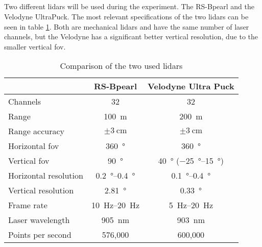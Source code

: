 \subsection{}
Two different \acrshort{lidar}s will be used during the experiment.
The RS-Bpearl and the Velodyne UltraPuck.
The most relevant specifications of the two \acrshort{lidar}s can be seen in table \ref{tab:lidar_datasheets}.
Both are mechanical \acrshort{lidar}s and have the same number of laser channels, but the Velodyne has a significant better vertical resolution, due to the smaller vertical \acrshort{fov}.
\begin{table}[ht]
	\centering
	\caption{Comparison of the two used \acrshort{lidar}s \cite{RoboSense2020}\cite{Rev}}
	\label{tab:lidar_datasheets}
	\begin{tabular}[t]{lcc}
	\toprule
	&\textbf{RS-Bpearl} & \textbf{Velodyne Ultra Puck}\\
	\midrule
	Channels 					& 32 							& 32\\
	Range 						& \SI{100}{\metre}				& \SI{200}{\metre}\\
	Range accuracy				& $\pm\SI{3}{\centi\metre}$		& $\pm\SI{3}{\centi\metre}$\\
	Horizontal \acrshort{fov}	& \SI{360}{\degree}				& \SI{360}{\degree}\\
	Vertical \acrshort{fov} 	& \SI{90}{\degree} 				& \SI{40}{\degree} (\SIrange{-25}{15}{\degree})\\
	Horizontal resolution		& \SIrange{0.2}{0.4}{\degree} 	& \SIrange{0.1}{0.4}{\degree}\\
	Vertical resolution			& \SI{2.81}{\degree} 			& \SI{0.33}{\degree}\\
	Frame rate 					& \SIrange{10}{20}{\hertz}		& \SIrange{5}{20}{\hertz}\\
	Laser wavelength 			& \SI{905}{\nano\metre} 		& \SI{903}{\nano\metre}\\
	Points per second 			& 576,000						& 600,000		\\
	\bottomrule
	\end{tabular}
	\end{table}%



